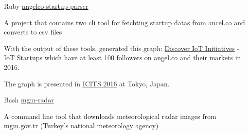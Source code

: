 
\begin{cventries}
  \cventry
    {Ruby} %
    {\href{https://github.com/erenhatirnaz/angelco-startup-parser}{angelco-startup-parser}} %
    {} %
    {} %
    {
      \begin{cvitems} %
        \item {A project that contains two cli tool for fetchting startup datas from ancel.co and converts to csv files}
		    \item {With the output of these tools, generated this
        graph: \href{https://graphcommons.com/graphs/8da5327d-7829-4dfe-b60b-4c0bda956b2a}{Discover
        IoT Initiatives} - IoT Startups which have at least 100 followers on
        angel.co and their markets in 2016.}
        \item {The graph is presented in \href{http://www.icits.org/}{ICITS 2016} at Tokyo, Japan.}
      \end{cvitems}
    }

  \cventry
    {Bash} %
    {\href{https://github.com/erenhatirnaz/mgm-radar}{mgm-radar}} %
    {} %
    {} %
    {
      \begin{cvitems} %
      	\item {A command line tool that downloads meteorological radar images
      	from mgm.gov.tr (Turkey's national meteorology agency)}
      \end{cvitems}
    }
\end{cventries}
